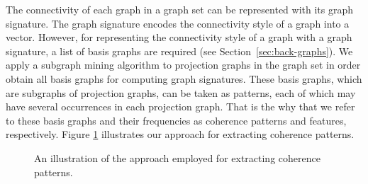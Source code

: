 The connectivity of each graph in a graph set can be represented with its graph signature.
The graph signature encodes the connectivity style of a graph into a vector. 
However, for representing the connectivity style of a graph with a graph signature, a list of basis graphs are required (see Section~\ref{sec:back-graphs}).  
We apply a subgraph mining algorithm to projection graphs in the graph set in order obtain all basis graphs for computing graph signatures. 
These basis graphs, which are subgraphs of projection graphs, can be taken as patterns, each of which may have several occurrences in each projection graph. 
That is the why that we refer to these basis graphs and their frequencies as coherence patterns and features, respectively.  
Figure \ref{fig:pattern-extraction} illustrates our approach for extracting coherence patterns.

\begin{figure}[!ht]
	\begin{center}
	\end{center}
	\caption{An illustration of the approach employed for extracting coherence patterns.}
	\label{fig:pattern-extraction}
\end{figure}



